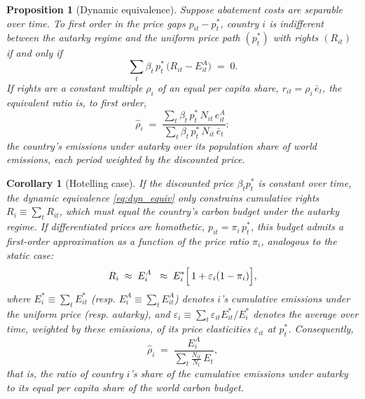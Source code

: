 \documentclass[12pt,english]{article}
\newtheorem{proposition}{Proposition}
\newtheorem{corollary}{Corollary}
\theoremstyle{remark}
\begin{document}
\begin{proposition}[Dynamic equivalence]\label{prop:dynamic}
Suppose abatement costs are separable over time. To first order in the price gaps $p_{it}-p^*_t$, country $i$ is indifferent between the autarky regime and the uniform price path $(p^*_t)$ with rights $(R_{it})$ if and only if
\begin{equation}
  \sum_t \beta_t\,p^*_t\,\bigl(R_{it}-E^A_{it}\bigr) \;=\; 0.
  \label{eq:dyn_equiv}
\end{equation}
If rights are a constant multiple $\rho_i$ of an equal per capita share, $r_{it}=\rho_i\,\bar e_t$,
the equivalent ratio is, to first order,
\begin{equation}
  \hat\rho_i \;=\; \frac{\sum_t \beta_t\,p^*_t\,N_{it}\,e^A_{it}}{\sum_t \beta_t\,p^*_t\,N_{it}\,\bar e_t}:%
  \label{eq:rhohat_dyn}
\end{equation}
the country's emissions under autarky over its population share of world emissions, each period weighted by the discounted price.
\end{proposition}

\begin{corollary}[Hotelling case]\label{cor:hotelling}
If the discounted price $\beta_t p^*_t$ is constant over time, the dynamic equivalence \eqref{eq:dyn_equiv} only constrains cumulative rights $R_i\equiv\sum_t R_{it}$, which must equal the country's carbon budget under the autarky regime. If differentiated prices are homothetic, $p_{it}=\pi_i\,p^*_t$, this budget admits a first-order approximation as a function of the price ratio $\pi_i$, analogous to the static case:
\begin{equation}
  R_i \;\approx\; E^A_i \;\;\approx\; E^*_i\Bigl[\,1+\varepsilon_i(1-\pi_i)\Bigr],
  \label{eq:hotelling_budget}
\end{equation}
where $E^*_i\equiv\sum_t E^*_{it}$ (resp. $E^A_i\equiv\sum_t E^A_{it}$) denotes $i$'s cumulative emissions under the uniform price (resp. autarky), and $\varepsilon_i\equiv\sum_t \varepsilon_{it}E^*_{it}/E^*_i$ denotes the average over time, weighted by these emissions, of its price elasticities $\varepsilon_{it}$ at $p^*_t$. Consequently,
\begin{equation}
  \hat\rho_i \;=\; \frac{E^A_i}{\sum_t \frac{N_{it}}{N_t}\,E_t},
  \label{eq:rhohat_hotelling}
\end{equation}
that is, the ratio of country $i$'s share of the cumulative emissions under autarky to its equal per capita share of the world carbon budget.
\end{corollary}
\end{document}
